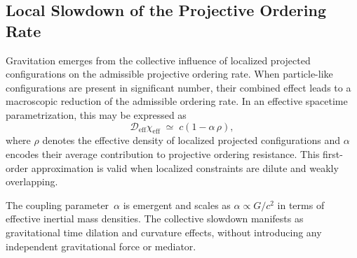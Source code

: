 \subsection{Local Slowdown of the Projective Ordering Rate}
  \label{subsec:local-slowdown-of-chi-relaxation}

  Gravitation emerges from the collective influence of localized projected
  configurations on the admissible projective ordering rate.
  When particle-like configurations are present in significant number,
  their combined effect leads to a macroscopic reduction of the admissible
  ordering rate.
  In an effective spacetime parametrization, this may be expressed as
  \begin{equation}
    \mathcal{D}_{\mathrm{eff}} \chi_{\mathrm{eff}}
    \;\simeq\;
    c \left( 1 - \alpha\, \rho \right),
  \end{equation}
  where $\rho$ denotes the effective density of localized projected
  configurations and $\alpha$ encodes their average contribution to
  projective ordering resistance.
  This first-order approximation is valid when localized constraints are
  dilute and weakly overlapping.

  The coupling parameter~$\alpha$ is emergent and scales as
  $\alpha \propto G / c^2$ in terms of effective inertial mass densities.
  The collective slowdown manifests as gravitational time dilation and
  curvature effects, without introducing any independent gravitational
  force or mediator.
